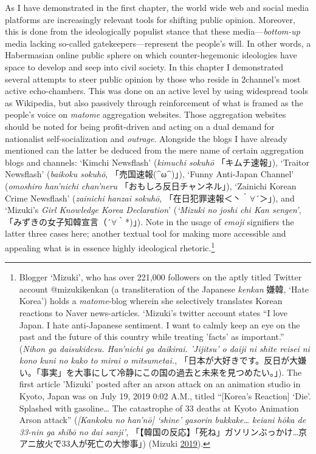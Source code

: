 \documentclass[10pt,british,A4paper,,openany]{memoir}
\begin{document}
As I have demonstrated in the first chapter, the world wide web and
social media platforms are increasingly relevant tools for shifting
public opinion. Moreover, this is done from the ideologically populist
stance that these media---\emph{bottom-up} media lacking so-called
gatekeepers---represent the people's will. In other words, a Habermasian
online public sphere on which counter-hegemonic ideologies have space to
develop and seep into civil society. In this chapter I demonstrated
several attempts to steer public opinion by those who reside in
2channel's most active echo-chambers. This was done on an active level
by using widespread tools as Wikipedia, but also passively through
reinforcement of what is framed as the people's voice on \emph{matome}
aggregation websites. Those aggregation websites should be noted for
being profit-driven and acting on a dual demand for nationalist
self-socialization and \emph{outrage}. Alongside the blogs I have
already mentioned can the latter be deduced from the mere name of
certain aggregation blogs and channels: `Kimchi Newsflash'
(\emph{kimuchi sokuhō} 「キムチ速報」), `Traitor Newsflash'
(\emph{baikoku sokuhō}, 「売国速報(\^{}ω\^{})」), `Funny Anti-Japan
Channel' (\emph{omoshiro han'nichi chan'neru}
「おもしろ反日チャンネル」), `Zainichi Korean Crime Newsflash'
(\emph{zainichi hanzai sokuhō}, 「在日犯罪速報＜丶｀\(\forall\)´＞」),
and `Mizuki's \emph{Girl Knowledge Korea Declaration}' (\emph{`Mizuki no
joshi chi Kan sengen'}, 「みずきの女子知韓宣言（´\(\forall\)｀*)」).
Note in the usage of \emph{emoji} signifiers the latter three cases
here; another textual tool for making more accessible and appealing what
is in essence highly ideological rhetoric.\footnote{Blogger `Mizuki',
  who has over 221,000 followers on the aptly titled Twitter account
  @mizukikenkan (a transliteration of the Japanese \emph{kenkan} 嫌韓,
  `Hate Korea') holds a \emph{matome}-blog wherein she selectively
  translates Korean reactions to Naver news-articles. `Mizuki's twitter
  account states ``I love Japan. I hate anti-Japanese sentiment. I want
  to calmly keep an eye on the past and the future of this country while
  treating 'facts' as important.'' (\emph{Nihon ga daisukidesu.
  Han'nichi ga daikirai. 'Jijitsu' o daiji ni shite reisei ni kono kuni
  no kako to mirai o mitsumetai.},
  「日本が大好きです。反日が大嫌い。「事実」を大事にして冷静にこの国の過去と未来を見つめたい。」).
  The first article 'Mizuki' posted after an arson attack on an
  animation studio in Kyoto, Japan was on July 19, 2019 0:02 A.M.,
  titled ``{[}Korea's Reaction{]} `Die'. Splashed with gasoline\ldots{}
  The catastrophe of 33 deaths at Kyoto Animation Arson attack''
  (\emph{{[}Kankoku no han'nō{]} `shine' gasorin bukkake\ldots{} keiani
  hōka de 33-nin ga shibō no dai sanji'},
  「【韓国の反応】「死ね」ガソリンぶっかけ\ldots{}京アニ放火で33人が死亡の大惨事」)
  (Mizuki \protect\hyperlink{ref-mizuki_eng._2019}{2019}).}
\end{document}
